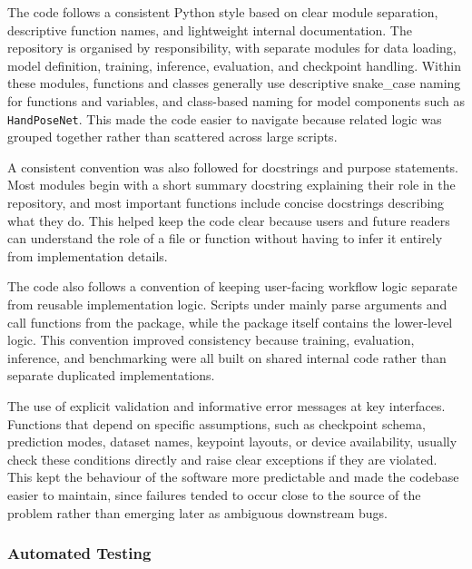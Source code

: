 ﻿\documentclass[11pt,a4paper]{article}
\begin{document}
The code follows a consistent Python style based on clear module separation,
descriptive function names, and lightweight internal documentation. The
repository is organised by responsibility, with separate modules for data
loading, model definition, training, inference, evaluation, and checkpoint
handling.
Within these modules, functions and classes generally use descriptive
snake\_case naming for functions and variables, and class-based naming for
model components such as \texttt{HandPoseNet}. This made the code easier to
navigate because related logic was grouped together rather than scattered
across large scripts.

\medskip

A consistent convention was also followed for docstrings and purpose
statements. Most modules begin with a short summary docstring explaining their
role in the repository, and most important functions include concise
docstrings describing what they do.
This helped keep the code clear because users and future readers can
understand the role of a file or function without having to infer it entirely
from implementation details.

\medskip

The code also follows a convention of keeping user-facing workflow logic
separate from reusable implementation logic. Scripts under 
mainly parse arguments and call functions from the 
package, while the package itself contains the lower-level logic.
This convention improved consistency because training, evaluation, inference,
and benchmarking were all built on shared internal code rather than separate
duplicated implementations.

\medskip


The use of explicit validation and informative error 
messages at key interfaces. Functions that depend on specific
assumptions, such as checkpoint schema, prediction modes, dataset names,
keypoint layouts, or device availability, usually check these conditions
directly and raise clear exceptions if they are violated.
This kept the behaviour of the software more predictable and made the codebase
easier to maintain, since failures tended to occur close to the source of the
problem rather than emerging later as ambiguous downstream bugs.

\subsubsection{Automated Testing}
\end{document}
